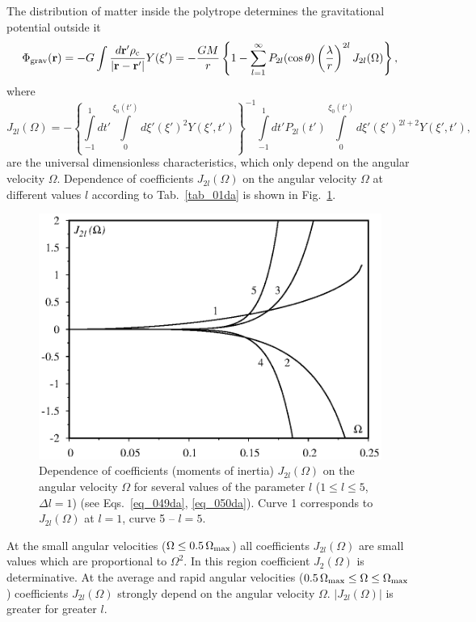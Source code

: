 \documentclass{caosp308}
\begin{document}
The distribution of matter inside the polytrope determines the gravitational potential outside it
\begin{equation}
\label{eq_049da}
\Phi_{\rm grav}({\bf r})=-G\int\frac{d{\bf r}'\rho_{\rm c}}{|{\bf r}-{\bf r}'|}Y(\xi')=
-\frac{GM}{r}\left\{1-\sum\limits_{l=1}^\infty P_{2l}(\cos\theta)\left(\frac{\lambda}{r}\right)^{2l}J_{2l}(\Omega)\right\},
\end{equation}
where
\begin{equation}
\label{eq_050da}
J_{2l}(\Omega)=-\left\{\int\limits_{-1}^{1}dt'\int\limits_{0}^{\xi_0(t')}d\xi'(\xi')^2Y(\xi',t')\right\}^{-1}
\int\limits_{-1}^{1}dt'P_{2l}(t')\int\limits_{0}^{\xi_0(t')}d\xi'(\xi')^{2l+2}Y(\xi',t'),
\end{equation}
are the universal dimensionless characteristics, which only depend on the angular velocity $\Omega$. Dependence of  coefficients $J_{2l}(\Omega)$ on the angular velocity $\Omega$ at different values $l$ according to Tab.~\ref{tab_01da} is shown in Fig.~\ref{fig_04da}.
\begin{figure}
\center\includegraphics[width=.7\textwidth]{fig_04.eps}
\caption{Dependence of  coefficients (moments of inertia) $J_{2l}(\Omega)$ on the angular velocity $\Omega$  for several values of the parameter $l$ ($1\leq l\leq 5$, $\Delta l=1$) (see Eqs.~\eqref{eq_049da}, \eqref{eq_050da}). Curve 1 corresponds to  $J_{2l}(\Omega)$ at $l=1$, curve 5 -- $l=5$.}
\label{fig_04da}
\end{figure}
At the small angular velocities ($\Omega\leq0.5\,\Omega_{\rm max}$) all coefficients $J_{2l}(\Omega)$ are small values which are proportional to $\Omega^2$.  In this region  coefficient $J_{2}(\Omega)$ is determinative. At the average and rapid angular velocities
($0.5\,\Omega_{\rm max}\leq\Omega\leq\Omega_{\rm max}$)  coefficients $J_{2l}(\Omega)$ strongly depend on the angular velocity $\Omega$. $|J_{2l}(\Omega)|$ is greater for greater $l$.
\end{document}
